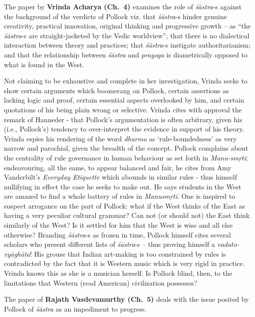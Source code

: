 The paper by {\bf Vrinda Acharya (Ch.~4)} examines the role of \hbox{{\sl śāstra}-s} against the background of the verdicts of Pollock viz. that {\sl śāstra}-s hinder genuine creativity, practical innovation, original thinking and progressive growth -- as “the {\sl śāstra}-s are straight-jacketed by the Vedic worldview”; that there is no dialectical interaction between theory and practices; that {\sl śāstra}-s instigate authoritarianism; and that the relationship between {\sl śāstra} and {\sl prayoga} is diametrically opposed to what is found in the West.

Not claiming to be exhaustive and complete in her investigation, Vrinda seeks to show certain arguments which boomerang on Pollock, certain assertions as lacking logic and proof, certain essential aspects overlooked by him, and certain quotations of his being plain wrong or selective. Vrinda cites with approval the remark of Hanneder - that Pollock’s argumentation is often arbitrary, given his (i.e., Pollock's) tendency to over-interpret the evidence in support of his theory. Vrinda espies his rendering of the word {\sl dharma} as ‘rule-boundedness’ as very narrow and parochial, given the breadth of the concept. Pollock complains about the centrality of rule governance in human behaviour as set forth in {\sl Manu-smṛti}; endeavouring, all the same, to appear balanced and fair, he cites from Amy Vanderbilt’s {\sl Everyday Etiquette} which abounds in similar rules - thus himself nullifying in effect the case he seeks to make out. He says students in the West are amazed to find a whole battery of rules in {\sl Manusmṛti}. One is inspired to suspect arrogance on the part of Pollock: what if the West thinks of the East as having a very peculiar cultural grammar? Can not (or should not) the East think similarly of the West? Is it settled for him that the West is wise and all else otherwise? Branding {\sl śāstra}-s as frozen in time, Pollock himself cites several scholars who present different lists of {\sl śāstra}-s -- thus proving himself a {\sl vadato-vyāghāta}! His grouse that Indian art-making is too constrained by rules is contradicted by the fact that it is Western music which is very rigid in practice. Vrinda knows this as she is a musician herself. Is Pollock blind, then, to the limitations that Western (read American) civilization possesses?
\vskip 8pt

The paper of {\bf Rajath Vasdevamurthy (Ch.~5)} deals with the issue posited by Pollock  of {\sl śāstra} as an impediment to progress.


